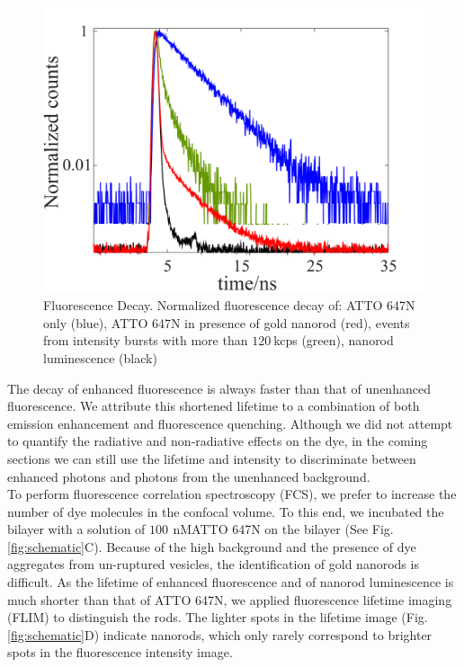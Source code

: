 \documentclass[journal=jpccck,manuscript=article]{achemso}
\newcommand{\nM}{\ensuremath{\,\textrm{nM}}}
\begin{document}
\begin{figure}
	\centering
	\includegraphics[]{lifetime_enhnc.png}
	\caption{Fluorescence Decay. Normalized fluorescence decay of: ATTO 647N only (blue), ATTO 647N in presence of gold nanorod (red), events from intensity bursts with more than $120~$kcps (green), nanorod luminescence (black)}
	\label{fig:lifetime_enhnc}
\end{figure}
The decay of enhanced fluorescence is always faster than that of unenhanced fluorescence. We attribute this shortened lifetime to a combination of both emission enhancement and fluorescence quenching. Although we did not attempt to quantify the radiative and non-radiative effects on the dye, in the coming sections we can still use the lifetime and intensity to discriminate between enhanced photons and photons from the unenhanced background.\\
To perform fluorescence correlation spectroscopy (FCS), we prefer to increase the number of dye molecules in the confocal volume. To this end, we incubated the bilayer with a solution of $100~$\nM ATTO 647N on the bilayer (See Fig. \ref{fig:schematic}C). Because of the high background and the presence of dye aggregates from un-ruptured vesicles, the identification of gold nanorods is difficult. As the lifetime of enhanced fluorescence and of nanorod luminescence is much shorter than that of ATTO 647N, we applied fluorescence lifetime imaging (FLIM) to distinguish the rods. The lighter spots in the lifetime image (Fig.\ref{fig:schematic}D) indicate nanorods, which only rarely correspond to brighter spots in the fluorescence intensity image.\\
\end{document}
